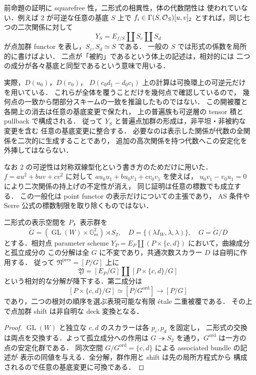 \begin{remark}[必要な仮定と相対的な計算]
\label{rem:qa-full-point-scheme-relative-base-change}
前命題の証明に squarefree 性，二形式の相異性，体の代数閉性は
使われていない．例えば $2$ が可逆な任意の基底 $S$ 上で
$f_i\in\Gamma(S,\mathcal O_S)[u,v]_2$ とすれば，同じ七つの二次関係に対して
\[
 Y_S=E_{f/S}\amalg S_c\amalg S_d
\]
が点加群 functor を表し，$S_c,S_d\simeq S$ である．
一般の $S$ では形式の係数を局所的に書けばよい．
二点が「被約」であるという体上の記述は，相対的には
二つの成分が各々基底と同型であるという意味で用いる．

実際，$D(u_0)$，$D(v_0)$，
$D(c_0d_1-d_0c_1)$ 上の計算は可換環上の可逆元だけを用いている．
これらが全体を覆うことだけを幾何点で確認しているので，
幾何点の一致から閉部分スキームの一致を推論したものではない．
この開被覆と各開上の消去は任意の基底変更で保たれ，
上の普遍族も可逆層の tensor 積と pullback で構成される．
従って $Y_S$ と普遍点加群の形成は，非平坦・非被約な変更を含む
任意の基底変更に整合する．
必要なのは表示した関係が代数の全関係を二次的に生成することであり，
追加の高次関係を持つ代数へこの安定化を外挿してはならない．

なお $2$ の可逆性は対称双線型化という書き方のためだけに用いた．
$f=a u^2+buv+cv^2$ に対して
$a u_0u_1+b u_0v_1+c v_0v_1$ を使えば，
$u_0v_1-v_0u_1=0$ により二次関係の持上げの不定性が消え，
同じ証明は任意の標数でも成立する．
この一般化は point functor の表示だけについての主張であり，
AS 条件や Serre 公式の標数制限を取り除くものではない．
\end{remark}

\begin{corollary}[孤立二点と根対の順序付け]
\label{cor:qa-isolated-points-ordering-cover}
二形式の表示空間を $P$，表示群を
\[
 \widetilde G=(\operatorname{GL}(W)\times\mathbb G_m^2)\rtimes S_2,
 \quad D=\{(\lambda I_W,\lambda,\lambda)\},
 \quad G=\widetilde G/D
\]
とする．相対点 parameter scheme
$Y_P=E_P\amalg(P\times\{c,d\})$ において，曲線成分と孤立成分の
この分解は全 $G$ に不変であり，共通次数スカラー $D$ は自明に作用する．
従って $\mathfrak N^{\mathrm{pres}}=[P/G]$ 上に
\[
 \mathfrak Y=[E_P/G]\amalg[P\times\{c,d\}/G]
\]
という相対的な分解が降下する．第二成分は
\[
 [P\times\{c,d\}/G]\simeq[P/G^{\mathrm{ord}}]
 \longrightarrow[P/G]
\]
であり，二つの根対の順序を選ぶ表現可能な有限 \'etale 二重被覆である．
その上で点加群 shift は非自明な deck 変換となる．
\end{corollary}
\begin{proof}
$\operatorname{GL}(W)$ と独立な $c,d$ のスカラーは各 $p_c,p_d$ を固定し，
二形式の交換は両点を交換する．よって孤立成分への作用は
$G\twoheadrightarrow S_2$ を通り，$G^{\mathrm{ord}}$ は一方の点の安定化群である．
同次空間 $G/G^{\mathrm{ord}}=\{c,d\}$ による associated bundle の記述が
表示の同値を与える．全分解，群作用と shift は先の局所方程式から
構成されるので任意の基底変更に可換である．
\end{proof}

